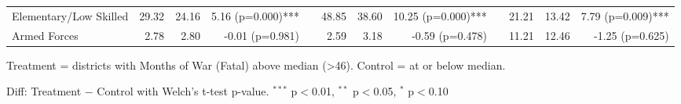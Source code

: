 \begin{table}[htbp]
\begin{tabular}{l rrr c rrr c rrr}
\quad Elementary/Low Skilled & 29.32 & 24.16 & 5.16 (p=0.000)*** &  & 48.85 & 38.60 & 10.25 (p=0.000)*** &  & 21.21 & 13.42 & 7.79 (p=0.009)*** \\
\quad Armed Forces & 2.78 & 2.80 & -0.01 (p=0.981) &  & 2.59 & 3.18 & -0.59 (p=0.478) &  & 11.21 & 12.46 & -1.25 (p=0.625) \\
\bottomrule
\end{tabular}
\begin{tablenotes}
\small
\item Treatment = districts with Months of War (Fatal) above median (>46). Control = at or below median.
\item Diff: Treatment $-$ Control with Welch's t-test p-value. $^{{***}}$ p$<$0.01, $^{{**}}$ p$<$0.05, $^{{*}}$ p$<$0.10
\end{tablenotes}
\end{table}

\clearpage

